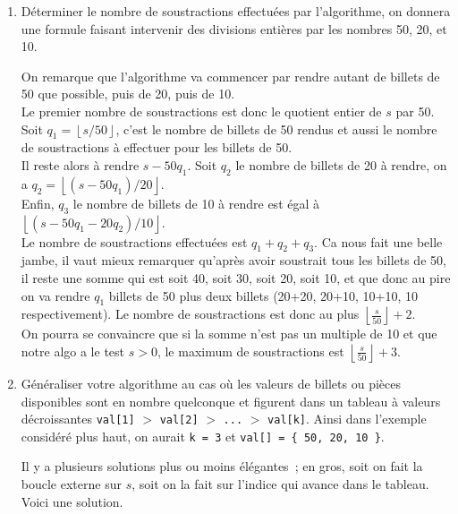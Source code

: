 \documentclass[10pt,a4paper]{article}
\begin{document}
\begin{enumerate}
\begin{tcolorbox}
\end{tcolorbox}




\item Déterminer le nombre de soustractions effectuées par l'algorithme, on donnera une formule faisant intervenir des divisions entières par les nombres 50, 20, et 10.

\begin{tcolorbox}
On remarque que l'algorithme va commencer par rendre autant de billets de 50 que possible, puis de 20, puis de 10.\\

Le premier nombre de soustractions est donc le quotient entier de $s$ par 50. Soit $q_1=\left\lfloor s/50\right\rfloor$, c'est le nombre de billets de 50 rendus et aussi le nombre de soustractions à effectuer pour les billets de 50. \\

Il reste alors à rendre $s-50q_1$. Soit $q_2$ le nombre de billets de 20 à rendre, on a $q_2=\left\lfloor (s-50q_1)/20\right\rfloor$. \\

Enfin, $q_3$ le nombre de billets de 10 à rendre est égal à $\left\lfloor (s-50q_1-20q_2)/10\right\rfloor$.\\

Le nombre de soustractions effectuées est $q_1 + q_2 + q_3$. Ca nous fait une belle jambe, il vaut mieux remarquer qu'après avoir soustrait tous les billets de 50, il reste une somme qui est soit 40, soit 30, soit 20, soit 10, et que donc au pire on va rendre $q_1$ billets de 50 plus deux billets (20+20, 20+10, 10+10, 10 respectivement). Le nombre de soustractions est donc au plus $\left\lfloor \frac{s}{50}\right\rfloor + 2$. \\

On pourra se convaincre que si la somme n'est pas un multiple de 10 et que notre algo a le test $s>0$, le maximum de soustractions est $\left\lfloor \frac{s}{50}\right\rfloor + 3$.
\end{tcolorbox}

\item Généraliser votre algorithme au cas où les valeurs de billets ou pièces disponibles sont en nombre quelconque et figurent dans un tableau à valeurs décroissantes \verb:val[1]: $>$ \verb:val[2]: $>$ \verb:...: $>$ \verb:val[k]:. Ainsi dans l'exemple considéré plus haut, on aurait \verb:k = 3: et \verb:val[] = { 50, 20, 10 }:.

\begin{tcolorbox}
Il y a plusieurs solutions plus ou moins élégantes~; en gros, soit on fait la boucle externe sur $s$, soit on la fait sur l'indice qui avance dans le tableau. Voici une solution.




\end{tcolorbox}
\end{enumerate}
\end{document}

